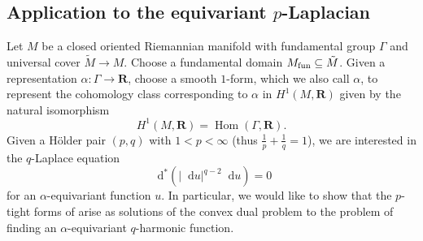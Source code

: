 \documentclass[reqno,11pt]{amsart}
\newcommand{\RR}{\mathbf{R}}
\newcommand*\dif{\mathop{}\!\mathrm{d}}
\DeclareMathOperator{\Hom}{Hom}
\theoremstyle{definition}
\numberwithin{equation}{section}
\begin{document}
\subsection{Application to the equivariant \texorpdfstring{$p$-Laplacian}{p-Laplacian}}
Let $M$ be a closed oriented Riemannian manifold with fundamental group $\Gamma$ and universal cover $\tilde M \to M$.
Choose a fundamental domain $M_{\rm fun} \subseteq \tilde M$.
Given a representation $\alpha: \Gamma \to \RR$, choose a smooth $1$-form, which we also call $\alpha$, to represent the cohomology class corresponding to $\alpha$ in $H^1(M, \RR)$ given by the natural isomorphism
$$H^1(M, \RR) = \Hom(\Gamma, \RR).$$
Given a H\"older pair $(p, q)$ with $1 < p < \infty$ (thus $\frac{1}{p} + \frac{1}{q} = 1$),
we are interested in the $q$-Laplace equation
$$\dif^* (|\dif u|^{q - 2} \dif u) = 0$$
for an $\alpha$-equivariant function $u$.
In particular, we would like to show that the $p$-tight forms of \cite{BackusBest1} arise as solutions of the convex dual problem to the problem of finding an $\alpha$-equivariant $q$-harmonic function.
\end{document}

